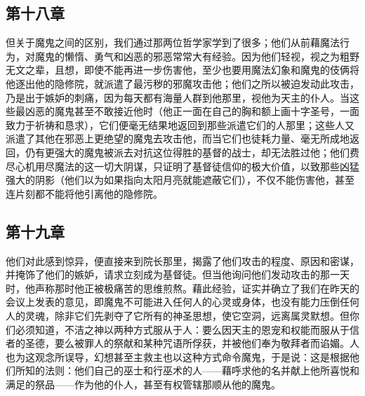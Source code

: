 
\subsection{第十八章\newline{}}

\par

但关于魔鬼之间的区别，我们通过那两位哲学家学到了很多；他们从前藉魔法行为，对魔鬼的懒惰、勇气和凶恶的邪恶常常大有经验。因为他们轻视，视之为粗野无文之辈，且想，即使不能再进一步伤害他，至少也要用魔法幻象和魔鬼的伎俩将他逐出他的隐修院，就派遣了最污秽的邪魔攻击他；他们之所以被迫发动此攻击，乃是出于嫉妒的刺痛，因为每天都有海量人群到他那里，视他为天主的仆人。当这些最凶恶的魔鬼甚至不敢接近他时（他正一面在自己的胸和额上画十字圣号，一面致力于祈祷和恳求），它们便毫无结果地返回到那些派遣它们的人那里；这些人又派遣了其他在邪恶上更绝望的魔鬼去攻击他，而当它们也徒耗力量、毫无所成地返回，仍有更强大的魔鬼被派去对抗这位得胜的基督的战士，却无法胜过他；他们费尽心机用尽魔法的这一切大阴谋，只证明了基督徒信仰的极大价值，以致那些凶猛强大的阴影（他们以为如果指向太阳月亮就能遮蔽它们），不仅不能伤害他，甚至连片刻都不能将他引离他的隐修院。\par


\subsection{第十九章\newline{}}

\par

他们对此感到惊异，便直接来到院长那里，揭露了他们攻击的程度、原因和密谋，并掩饰了他们的嫉妒，请求立刻成为基督徒。但当他询问他们发动攻击的那一天时，他声称那时他正被极痛苦的思维煎熬。藉此经验，证实并确立了我们在昨天的会议上发表的意见，即魔鬼不可能进入任何人的心灵或身体，也没有能力压倒任何人的灵魂，除非它们先剥夺了它所有的神圣思想，使它空洞，远离属灵默想。但你们必须知道，不洁之神以两种方式服从于人：要么因天主的恩宠和权能而服从于信者的圣德，要么被罪人的祭献和某种咒语所俘获，并被他们奉为敬拜者而谄媚。人也为这观念所误导，幻想甚至主救主也以这种方式命令魔鬼，于是说：这是根据他们所知的法则：他们自己的巫士和行巫术的人——藉呼求他的名并献上他所喜悦和满足的祭品——作为他的仆人，甚至有权管辖那顺从他的魔鬼。\par

